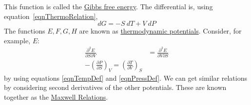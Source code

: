 \documentclass[../Main.tex]{subfiles}
\begin{document}
This function is called the \underline{Gibbs free energy}. 
The differential is, using equation~\ref{eqnThermoRelation},
\begin{equation*}
    dG = -S~dT + V~dP
\end{equation*}
The functions $E, F, G, H$ are known as \underline{thermodynamic potentials}. Consider, for example, $E$:
\begin{align*}
    \frac{\partial^2 E}{\partial S \partial V} &= \frac{\partial^2 E}{\partial V \partial S} \\
    -\left(\frac{\partial P}{\partial S}\right)_V = \left(\frac{\partial T}{\partial V}\right)_S
\end{align*}
by using equations \ref{eqnTempDef} and \ref{eqnPressDef}. We can get similar relations by considering second derivatives of the other potentials. These are known together as the \underline{Maxwell Relations}.
\end{document}
